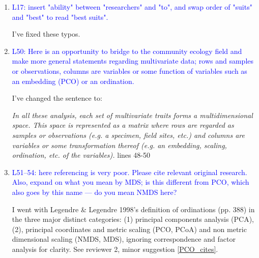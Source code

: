 \documentclass[12pt,letterpaper]{article}
\begin{document}
\begin{enumerate}

\item{\textcolor{blue}{L17: insert "ability" between "researchers" and "to", and swap order of "suits" and "best" to read "best suits".}}

I've fixed these typos.

\item{\textcolor{blue}{L50: Here is an opportunity to bridge to the community ecology field and make more general statements regarding multivariate data; rows and samples or observations, columns are variables or some function of variables such as an embedding (PCO) or an ordination.}}

I've changed the sentence to:
\label{rows}

\textit{In all these analysis, each set of multivariate traits forms a multidimensional space. This space is represented as a matrix where rows are regarded as samples or observations (e.g. a specimen, field sites, etc.) and columns are variables or some transformation thereof (e.g. an embedding, scaling, ordination, etc. of the variables).} lines 48-50

\item{\textcolor{blue}{L51--54: here referencing is very poor. Please cite relevant original research. Also, expand on what you mean by MDS; is this different from PCO, which also goes by this name --- do you mean NMDS here?}}

I went with Legendre \& Legendre 1998's definition of ordinations (pp. 388) in the three major distinct categories: (1) principal components analysis (PCA), (2), principal coordinates and metric scaling (PCO, PCoA) and non metric dimensional scaling (NMDS, MDS), ignoring correspondence and factor analysis for clarity. See reviewer 2, minor suggestion \ref{PCO_cites}.


\end{enumerate}
\end{document}

